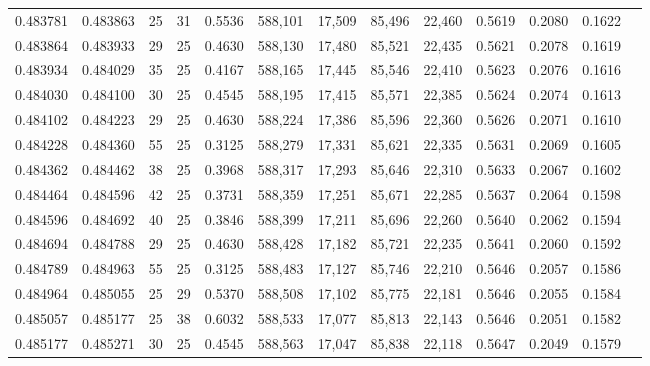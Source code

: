 \begin{tabular}{rrrrrrrrrrrrr}
0.483781 & 0.483863 &    25 &  31 &                                     0.5536 & 588,101 &  17,509 &  85,496 &  22,460 & 0.5619 & 0.2080 & 0.1622 \\
0.483864 & 0.483933 &    29 &  25 &                                     0.4630 & 588,130 &  17,480 &  85,521 &  22,435 & 0.5621 & 0.2078 & 0.1619 \\
0.483934 & 0.484029 &    35 &  25 &                                     0.4167 & 588,165 &  17,445 &  85,546 &  22,410 & 0.5623 & 0.2076 & 0.1616 \\
0.484030 & 0.484100 &    30 &  25 &                                     0.4545 & 588,195 &  17,415 &  85,571 &  22,385 & 0.5624 & 0.2074 & 0.1613 \\
0.484102 & 0.484223 &    29 &  25 &                                     0.4630 & 588,224 &  17,386 &  85,596 &  22,360 & 0.5626 & 0.2071 & 0.1610 \\
0.484228 & 0.484360 &    55 &  25 &                                     0.3125 & 588,279 &  17,331 &  85,621 &  22,335 & 0.5631 & 0.2069 & 0.1605 \\
0.484362 & 0.484462 &    38 &  25 &                                     0.3968 & 588,317 &  17,293 &  85,646 &  22,310 & 0.5633 & 0.2067 & 0.1602 \\
0.484464 & 0.484596 &    42 &  25 &                                     0.3731 & 588,359 &  17,251 &  85,671 &  22,285 & 0.5637 & 0.2064 & 0.1598 \\
0.484596 & 0.484692 &    40 &  25 &                                     0.3846 & 588,399 &  17,211 &  85,696 &  22,260 & 0.5640 & 0.2062 & 0.1594 \\
0.484694 & 0.484788 &    29 &  25 &                                     0.4630 & 588,428 &  17,182 &  85,721 &  22,235 & 0.5641 & 0.2060 & 0.1592 \\
0.484789 & 0.484963 &    55 &  25 &                                     0.3125 & 588,483 &  17,127 &  85,746 &  22,210 & 0.5646 & 0.2057 & 0.1586 \\
0.484964 & 0.485055 &    25 &  29 &                                     0.5370 & 588,508 &  17,102 &  85,775 &  22,181 & 0.5646 & 0.2055 & 0.1584 \\
0.485057 & 0.485177 &    25 &  38 &                                     0.6032 & 588,533 &  17,077 &  85,813 &  22,143 & 0.5646 & 0.2051 & 0.1582 \\
0.485177 & 0.485271 &    30 &  25 &                                     0.4545 & 588,563 &  17,047 &  85,838 &  22,118 & 0.5647 & 0.2049 & 0.1579 \\

\end{tabular}

